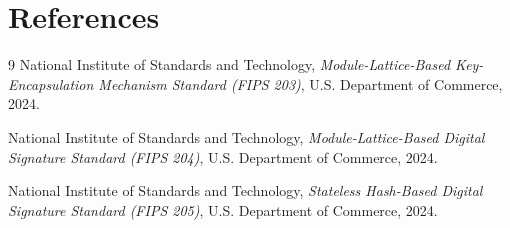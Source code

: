 \documentclass[11pt,a4paper]{article}
\begin{document}
\section{References}
\begin{thebibliography}{9}
National Institute of Standards and Technology,
\emph{Module-Lattice-Based Key-Encapsulation Mechanism Standard (FIPS 203)},
U.S. Department of Commerce, 2024.

National Institute of Standards and Technology,
\emph{Module-Lattice-Based Digital Signature Standard (FIPS 204)},
U.S. Department of Commerce, 2024.

National Institute of Standards and Technology,
\emph{Stateless Hash-Based Digital Signature Standard (FIPS 205)},
U.S. Department of Commerce, 2024.
\end{thebibliography}
\end{document}
